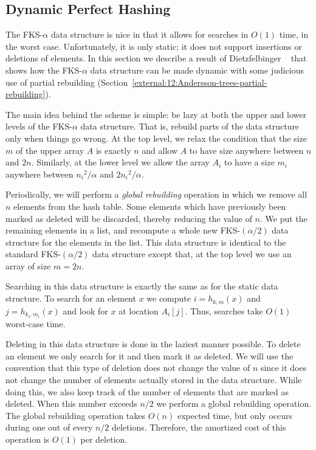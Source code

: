\subsection{Dynamic Perfect Hashing}
\label{hash:sec:dphash}
The FKS-$\alpha$ data structure is nice in that it allows for searches
in $O(1)$ time, in the worst case.  Unfortunately, it is only static;
it does not support insertions or deletions of elements.  In this
section we describe a result of Dietzfelbinger \etal\ \cite{dkmm94}
that shows how the FKS-$\alpha$ data structure can be made dynamic
with some judicious use of partial rebuilding
(Section~\ref{external:12:Andersson-trees-partial-rebuilding}).

The main idea behind the scheme is simple: be lazy at both the upper
and lower levels of the FKS-$\alpha$ data structure.  That is, rebuild
parts of the data structure only when things go wrong.  At the top
level, we relax the condition that the size $m$ of the upper array $A$
is exactly $n$ and allow $A$ to have size anywhere between $n$ and
$2n$.  Similarly, at the lower level we allow the array $A_i$ to have
a size $m_i$ anywhere between $n_i{}^2/\alpha$ and $2n_i{}^2/\alpha$.

Periodically, we will perform a \emph{global rebuilding} operation in
which we remove all $n$ elements from the hash table.  Some elements
which have previously been marked as deleted will be discarded,
thereby reducing the value of $n$.  We put the remaining elements in a
list, and recompute a whole new FKS-$(\alpha/2)$ data structure for
the elements in the list.  This data structure is identical to the
standard FKS-$(\alpha/2)$ data structure except that, at the top level
we use an array of size $m=2n$.

Searching in this data structure is exactly the same as for the static
data structure.  To search for an element $x$ we compute
$i=h_{k,m}(x)$ and $j=h_{k_i,m_i}(x)$ and look for $x$ at location
$A_i[j]$.   Thus, searches take $O(1)$ worst-case time.

Deleting in this data structure is done in the laziest manner
possible.  To delete an element we only search for it and then mark it
as deleted.  We will use the convention that this type of deletion
does not change the value of $n$ since it does not change the number
of elements actually stored in the data structure.  While doing this,
we also keep track of the number of elements that are marked as
deleted.  When this number exceeds $n/2$ we perform a global
rebuilding operation.  The global rebuilding operation takes $O(n)$
expected time, but only occurs during one out of every $n/2$
deletions.  Therefore, the amortized cost of this operation is $O(1)$
per deletion.

